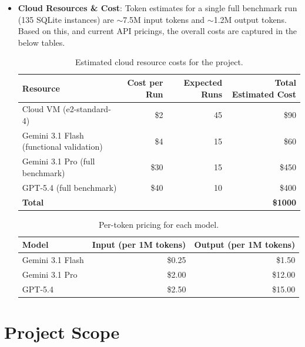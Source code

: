\begin{itemize}
    \item \textbf{Cloud Resources \& Cost}: Token estimates for a single full benchmark run (135 SQLite instances) are $\sim$7.5M input tokens and $\sim$1.2M output tokens. Based on this, and current API pricings, the overall costs are captured in the below tables.
    \begin{table}[H]
\centering
\begin{tabular}{|l|r|r|r|}
\hline
\textbf{Resource} & \textbf{Cost per Run} & \textbf{Expected Runs} & \textbf{Total Estimated Cost} \\
\hline
Cloud VM (e2-standard-4) & \$2 & 45 & \$90 \\
\hline
Gemini 3.1 Flash (functional validation) & \$4 & 15 & \$60 \\
\hline
Gemini 3.1 Pro (full benchmark) & \$30 & 15 & \$450 \\
\hline
GPT-5.4 (full benchmark) & \$40 & 10 & \$400 \\
\hline
\textbf{Total} & & & \textbf{\$1000} \\
\hline
\end{tabular}
\caption{Estimated cloud resource costs for the project.}
\label{tab:cloud-costs}
\end{table}

\begin{table}[H]
\centering
\begin{tabular}{|l|r|r|}
\hline
\textbf{Model} & \textbf{Input (per 1M tokens)} & \textbf{Output (per 1M tokens)} \\
\hline
Gemini 3.1 Flash & \$0.25 & \$1.50 \\
\hline
Gemini 3.1 Pro & \$2.00 & \$12.00 \\
\hline
GPT-5.4 & \$2.50 & \$15.00 \\
\hline
\end{tabular}
\caption{Per-token pricing for each model.}
\label{tab:token-pricing}
\end{table}


\end{itemize}



\section{Project Scope}
